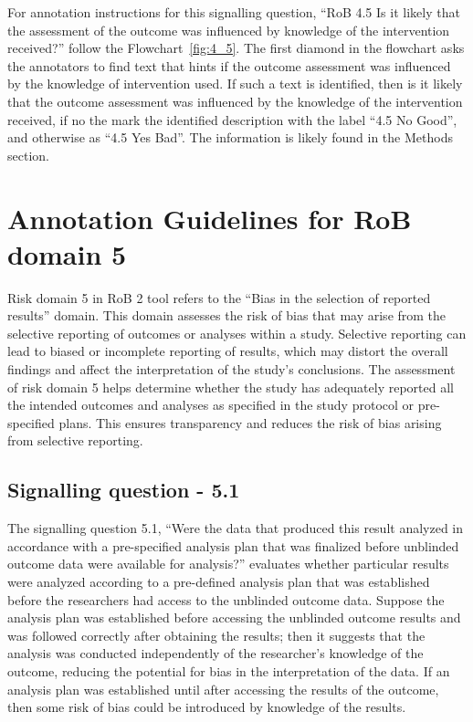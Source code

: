 \documentclass[sn-mathphys,Numbered]{sn-jnl}%
\begin{document}
For annotation instructions for this signalling question, ``RoB 4.5 Is it likely that the assessment of the outcome was influenced by knowledge of the intervention received?'' follow the Flowchart~\ref{fig:4_5}.
The first diamond in the flowchart asks the annotators to find text that hints if the outcome assessment was influenced by the knowledge of intervention used.
If such a text is identified, then is it likely that the outcome assessment was influenced by the knowledge of the intervention received, if no the mark the identified description with the label ``4.5 No Good'', and otherwise as ``4.5 Yes Bad''.
The information is likely found in the Methods section.

%
%
%
\section*{Annotation Guidelines for RoB domain 5}
\label{sec:dom5}
%
Risk domain 5 in RoB 2 tool refers to the ``Bias in the selection of reported results'' domain.
This domain assesses the risk of bias that may arise from the selective reporting of outcomes or analyses within a study.
Selective reporting can lead to biased or incomplete reporting of results, which may distort the overall findings and affect the interpretation of the study's conclusions.
The assessment of risk domain 5 helps determine whether the study has adequately reported all the intended outcomes and analyses as specified in the study protocol or pre-specified plans.
This ensures transparency and reduces the risk of bias arising from selective reporting.
%
%
%
\subsection*{Signalling question - 5.1 }
\label{subsec:5_1}
%
The signalling question 5.1, ``Were the data that produced this result analyzed in accordance with a pre-specified analysis plan that was finalized before unblinded outcome data were available for analysis?'' evaluates whether particular results were analyzed according to a pre-defined analysis plan that was established before the researchers had access to the unblinded outcome data.
Suppose the analysis plan was established before accessing the unblinded outcome results and was followed correctly after obtaining the results; then it suggests that the analysis was conducted independently of the researcher's knowledge of the outcome, reducing the potential for bias in the interpretation of the data.
If an analysis plan was established until after accessing the results of the outcome, then some risk of bias could be introduced by knowledge of the results.
\end{document}
